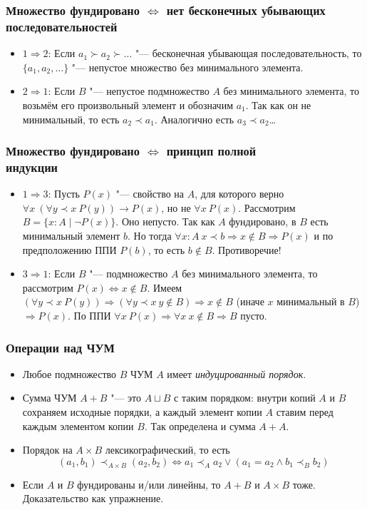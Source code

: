 \documentclass[10pt]{beamer}
\begin{document}
\begin{frame}
    \frametitle{Множество фундировано $\Leftrightarrow$ нет бесконечных убывающих последовательностей}
    \begin{itemize}
        \item $1 \Rightarrow 2$: Если $a_1 \succ a_2 \succ \ldots$ "--- бесконечная убывающая последовательность, то \pause \(\{a_1,a_2,\ldots\}\) "--- непустое множество без минимального элемента.
        \pause
        \item $2 \Rightarrow 1$: Если $B$ "--- непустое подмножество $A$ без минимального элемента, то \pause возьмём его произвольный элемент и обозначим $a_1$. \pause Так как он не минимальный, то есть $a_2 \prec a_1$. \pause Аналогично есть $a_3 \prec a_2$\ldots
    \end{itemize}
\end{frame}

\begin{frame}
    \frametitle{Множество фундировано $\Leftrightarrow$  принцип полной \\ индукции}
    \begin{itemize}
        \item $1 \Rightarrow 3$: Пусть $P(x)$ "--- свойство на $A$, для которого верно \( \forall x ~ (\forall y \prec x ~ P(y)) \to P(x) \), но не \( \forall x ~ P(x) \). Рассмотрим \(B = \{x:A \mid \neg P(x)\} \). Оно непусто. Так как $A$ фундировано, в $B$ есть минимальный элемент $b$. Но тогда \pause $\forall x : A ~ x \prec b \Rightarrow x \notin B \Rightarrow P(x)$ и по предположению ППИ $P(b)$, то есть $b \notin B$. Противоречие!
        \pause
        \item $3 \Rightarrow 1$: Если $B$ "--- подмножество $A$ без минимального элемента, то рассмотрим \( P(x) \Leftrightarrow x \notin B \). Имеем \((\forall y \prec x ~ P(y)) \Rightarrow (\forall y \prec x ~ y \notin B) \Rightarrow x \notin B \) (иначе $x$ минимальный в $B$) $\Rightarrow P(x)$\pause. По ППИ \( \forall x ~ P(x) \Rightarrow \forall x ~ x \notin B \Rightarrow B \) пусто.
    \end{itemize}
\end{frame}

\begin{frame}
    \frametitle{Операции над ЧУМ}
    \begin{itemize}
        \item Любое подмножество $B$ ЧУМ $A$ имеет \emph{индуцированный порядок}. 
        \item Сумма ЧУМ $A+B$ "--- это $A\sqcup B$ с таким порядком: внутри копий $A$ и $B$ сохраняем исходные порядки, а каждый элемент копии $A$ ставим перед каждым элементом копии $B$. Так определена и сумма $A+A$.
        \item Порядок на $A \times B$ лексикографический, то есть 
        \[ (a_1, b_1) \prec_{A \times B} (a_2, b_2) \Leftrightarrow a_1 \prec_A a_2 \lor (a_1 = a_2 \land b_1 \prec_B b_2) \]
        \item Если $A$ и $B$ фундированы и/или линейны, то $A+B$ и $A \times B$ тоже. Доказательство как упражнение.
    \end{itemize}
\end{frame}
\end{document}
